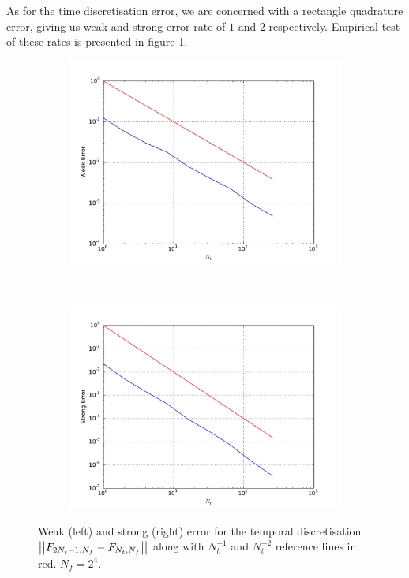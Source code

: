 \documentclass[11pt]{amsart}
\begin{document}
As for the time discretisation error, we are concerned with a rectangle quadrature
error, giving us weak and strong error rate of $1$ and $2$ respectively. Empirical
test of these rates is presented in figure \ref{img:rateFig3}.

\begin{figure}
    \centering
    \begin{subfigure}[b]{0.4\textwidth}
        \includegraphics[width=\textwidth]{weakerr3.pdf}
    \end{subfigure}
    ~ %
    \begin{subfigure}[b]{0.4\textwidth}
        \includegraphics[width=\textwidth]{strongerr3.pdf}
    \end{subfigure}
    \caption{\label{img:rateFig3} Weak (left) and strong (right) error
    for the temporal discretisation
    $\left| {\left| {{F_{2N_t-1,N_f}-F_{N_t,N_f}}} \right|} \right|_{}$
    along with $N_t^{-1}$ and $N_t^{-2}$ reference lines in red. $N_f= 2^4$.}
\end{figure}
\end{document}

